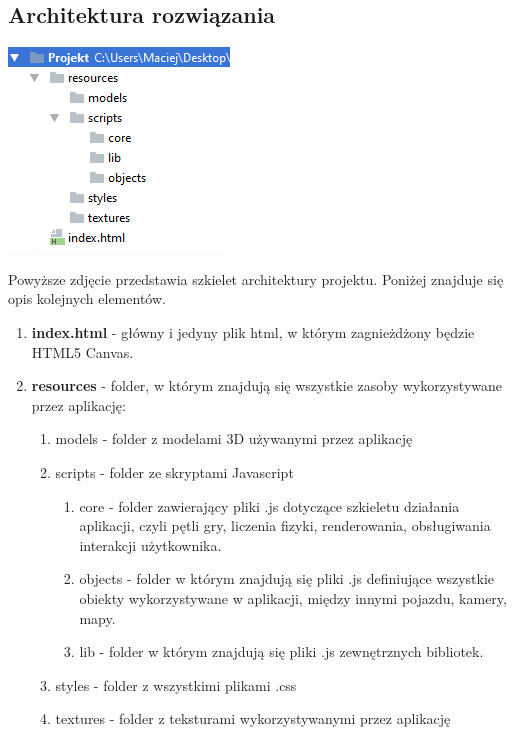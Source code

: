 \documentclass[11pt]{article}
\let\Oldsubsection\subsection
\renewcommand{\subsection}{\FloatBarrier\Oldsubsection}
\begin{document}
\newpage
\subsection{Architektura rozwiązania}
\begin{center}
\includegraphics[scale=1]{architecture}
\end{center}

Powyższe zdjęcie przedstawia szkielet architektury projektu. Poniżej znajduje się opis kolejnych elementów.

\begin{enumerate}
\item \textbf{index.html} - główny i jedyny plik html, w którym zagnieżdżony będzie HTML5 Canvas.
\item \textbf{resources} - folder, w którym znajdują się wszystkie zasoby wykorzystywane przez aplikację:
\begin{enumerate}
\item models - folder z modelami 3D używanymi przez aplikację
\item scripts - folder ze skryptami Javascript
\begin{enumerate}
\item core - folder zawierający pliki .js dotyczące szkieletu działania aplikacji, czyli pętli gry, liczenia fizyki, renderowania, obsługiwania interakcji użytkownika.
\item objects - folder w którym znajdują się pliki .js definiujące wszystkie obiekty wykorzystywane w aplikacji, między innymi pojazdu, kamery, mapy.
\item lib - folder w którym znajdują się pliki .js zewnętrznych bibliotek.
\end{enumerate}
\item styles - folder z wszystkimi plikami .css
\item textures - folder z teksturami wykorzystywanymi przez aplikację
\end{enumerate}
\end{enumerate}
\end{document}
